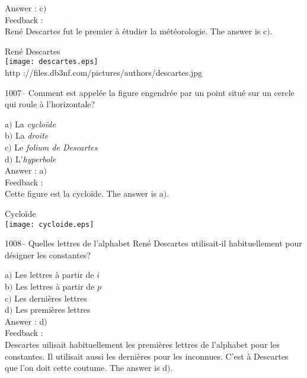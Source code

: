 ﻿\documentclass[letterpaper, 12pt]{article}
\begin{document}
Answer : c$)$\\

Feedback : \\
Ren\'e Descartes fut le premier \`a \'etudier la m\'et\'eorologie.
The answer is c$)$.\\

        \begin{center}
        Ren\'e Descartes\\
    \texttt{[image: descartes.eps]}\\
        {\footnotesize http
://files.db3nf.com/pictures/authors/descartes.jpg}
    \end{center}

1007-- Comment est appel\'ee la figure engendr\'ee par un point situ\'e sur
un cercle qui roule \`a l'horizontale?

a$)$ La {\sl cyclo\"ide} \\
b$)$ La {\sl droite} \\
c$)$ Le {\sl folium de Descartes} \\
d$)$ L'{\sl hyperbole}\\

Answer : a$)$\\

Feedback : \\
Cette figure est la cyclo\"ide.
The answer is a$)$.\\

        \begin{center}
       Cyclo\"ide \\
    \texttt{[image: cycloide.eps]}\\
    \end{center}

1008-- Quelles lettres de l'alphabet Ren\'e Descartes utilisait-il
habituellement pour d\'esigner les constantes?

a$)$ Les lettres \`a partir de $i$ \\
b$)$ Les lettres \`a partir de $p$ \\
c$)$ Les derni\`eres lettres \\
d$)$ Les premi\`eres lettres\\

Answer : d$)$\\

Feedback : \\
Descartes uilisait habituellement les premi\`eres lettres de
l'alphabet pour les constantes. Il utilisait aussi les derni\`eres
pour les inconnues. C'est \`a Descartes que l'on doit cette coutume.
The answer is d$)$.\\
\end{document}
